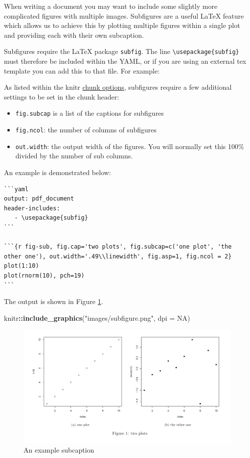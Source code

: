 \documentclass[]{book}
\newenvironment{Shaded}{\begin{snugshade}}{\end{snugshade}}
\newcommand{\KeywordTok}[1]{\textcolor[rgb]{0.13,0.29,0.53}{\textbf{#1}}}
\newcommand{\DataTypeTok}[1]{\textcolor[rgb]{0.13,0.29,0.53}{#1}}
\newcommand{\StringTok}[1]{\textcolor[rgb]{0.31,0.60,0.02}{#1}}
\newcommand{\OtherTok}[1]{\textcolor[rgb]{0.56,0.35,0.01}{#1}}
\newcommand{\OperatorTok}[1]{\textcolor[rgb]{0.81,0.36,0.00}{\textbf{#1}}}
\newcommand{\NormalTok}[1]{#1}
\providecommand{\tightlist}{%
  \setlength{\itemsep}{0pt}\setlength{\parskip}{0pt}}
\begin{document}
When writing a document you may want to include some slightly more
complicated figures with multiple images. Subfigures are a useful LaTeX
feature which allows us to achieve this by plotting multiple figures
within a single plot and providing each with their own subcaption.

Subfigures require the LaTeX package \texttt{subfig}. The line
\texttt{\textbackslash{}usepackage\{subfig\}} must therefore be included
within the YAML, or if you are using an external tex template you can
add this to that file. For example:

As listed within the knitr
\href{https://yihui.name/knitr/options/}{chunk options}, subfigures
require a few additional settings to be set in the chunk header:

\begin{itemize}
\tightlist
\item
  \texttt{fig.subcap} is a list of the captions for subfigures
\item
  \texttt{fig.ncol}: the number of columns of subfigures
\item
  \texttt{out.width}: the output width of the figures. You will normally
  set this 100\% divided by the number of sub columns.
\end{itemize}

An example is demonstrated below:

\begin{verbatim}
```yaml
output: pdf_document
header-includes:
   - \usepackage{subfig}
```

```{r fig-sub, fig.cap='two plots', fig.subcap=c('one plot', 'the other one'), out.width='.49\\linewidth', fig.asp=1, fig.ncol = 2}
plot(1:10)
plot(rnorm(10), pch=19)
```
\end{verbatim}

The output is shown in Figure \ref{fig:subcaptions}.

\begin{Shaded}
\begin{Highlighting}[]
\NormalTok{knitr}\OperatorTok{::}\KeywordTok{include_graphics}\NormalTok{(}\StringTok{"images/subfigure.png"}\NormalTok{, }\DataTypeTok{dpi =} \OtherTok{NA}\NormalTok{)}
\end{Highlighting}
\end{Shaded}

\begin{figure}
\centering
\includegraphics{images/subfigure.png}
\caption{\label{fig:subcaptions}An example subcaption}
\end{figure}
\end{document}
